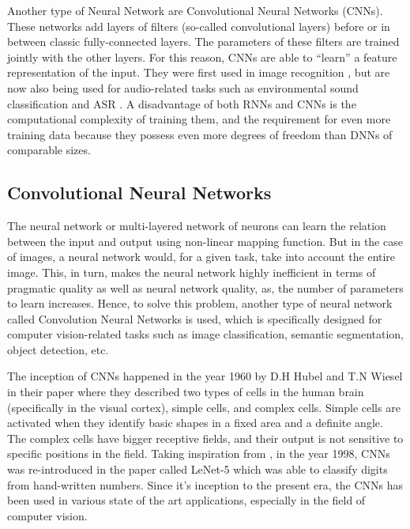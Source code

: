             Another type of Neural Network are Convolutional Neural Networks (CNNs). 
            These networks add layers of filters (so-called convolutional layers) before or in between classic fully-connected layers. 
            The parameters of these filters are trained jointly with the other layers. For this reason, CNNs are able to ``learn'' a feature representation of the input. 
            They were first used in image recognition \cite{krizhevsky}, but are now also being used for audio-related tasks such as environmental sound classification \cite{piczak} and ASR \cite{abdelhamid}. 
            A disadvantage of both RNNs and CNNs is the computational complexity of training them, and the requirement for even more training data because they possess even more degrees of freedom than DNNs of comparable sizes.

        \subsection{Convolutional Neural Networks}

            The neural network or multi-layered network of neurons can learn the relation between the input and output using non-linear mapping function. 
            But in the case of images, a neural network would, for a given task, take into account the entire image. 
            This, in turn, makes the neural network highly inefficient in terms of pragmatic quality as well as neural network quality, as, the number of parameters to learn increases. 
            Hence, to solve this problem, another type of neural network called Convolution Neural Networks is used, which is specifically designed for computer vision-related tasks such as image classification, semantic segmentation, object detection, etc.

            The inception of CNNs happened in the year 1960 by D.H Hubel and T.N Wiesel in their paper \cite{hubel1962receptive} where they described two types of cells in the human brain (specifically in the visual cortex), simple cells, and complex cells. 
            Simple cells are activated when they identify basic shapes in a fixed area and a definite angle. 
            The complex cells have bigger receptive fields, and their output is not sensitive to specific positions in the field. 
            Taking inspiration from \cite{hubel1962receptive}, in the year 1998, CNNs was re-introduced in the paper \cite{lecun1998gradient} called LeNet-5 which was able to classify digits from hand-written numbers. 
            Since it's inception to the present era, the CNNs has been used in various state of the art applications, especially in the field of computer vision.

